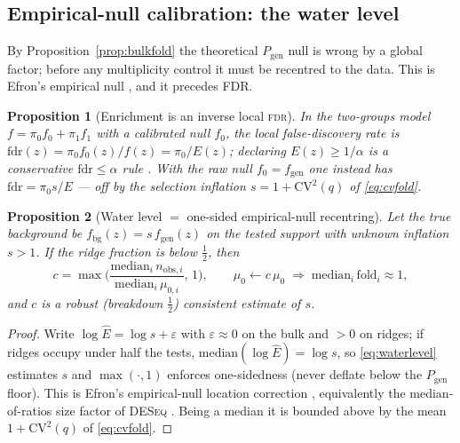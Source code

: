 \documentclass[11pt]{article}
\theoremstyle{oldplain}
\newtheorem{proposition}{Proposition}
\theoremstyle{oldrem}
\newcommand{\Pgen}{P_{\mathrm{gen}}}
\begin{document}
\subsection{Empirical-null calibration: the water level}\label{sec:dens-null}

By Proposition~\ref{prop:bulkfold} the theoretical $\Pgen$ null is wrong by a global factor; before any
multiplicity control it must be recentred to the data. This is Efron's empirical null
\cite{Efron2004}, and it precedes {\scshape FDR}.

\begin{proposition}[Enrichment is an inverse local {\scshape fdr}]\label{prop:localfdr}
In the two-groups model $f=\pi_0 f_0+\pi_1 f_1$ with a \emph{calibrated} null $f_0$, the local false-discovery
rate is $\mathrm{fdr}(z)=\pi_0 f_0(z)/f(z)=\pi_0/E(z)$; declaring $E(z)\ge1/\alpha$ is a conservative
$\mathrm{fdr}\le\alpha$ rule \cite{Efron2004}. With the raw null $f_0=f_{\mathrm{gen}}$ one instead has
$\mathrm{fdr}=\pi_0 s/E$ --- off by the selection inflation $s=1+\mathrm{CV}^2(q)$ of \eqref{eq:cvfold}.
\end{proposition}

\begin{proposition}[Water level $=$ one-sided empirical-null recentring]\label{prop:empnull}
Let the true background be $f_{\mathrm{bg}}(z)=s\,f_{\mathrm{gen}}(z)$ on the tested support with unknown
inflation $s>1$. If the ridge fraction is below $\tfrac12$, then
\begin{equation}\label{eq:waterlevel}
  c=\max\!\Big(\frac{\mathrm{median}_i\,n_{\mathrm{obs},i}}{\mathrm{median}_i\,\mu_{0,i}},\,1\Big),
  \qquad \mu_0\leftarrow c\,\mu_0
  \;\Longrightarrow\; \mathrm{median}_i\,\mathrm{fold}_i\approx1,
\end{equation}
and $c$ is a robust (breakdown $\tfrac12$) consistent estimate of $s$.
\end{proposition}
\begin{proof}
Write $\log\hat E=\log s+\varepsilon$ with $\varepsilon\approx0$ on the bulk and $>0$ on ridges; if ridges
occupy under half the tests, $\mathrm{median}(\log\hat E)=\log s$, so \eqref{eq:waterlevel} estimates $s$ and
$\max(\cdot,1)$ enforces one-sidedness (never deflate below the $\Pgen$ floor). This is Efron's empirical-null
location correction \cite{Efron2004}, equivalently the median-of-ratios size factor of {\scshape DESeq}
\cite{AndersHuber2010}. Being a median it is bounded above by the mean $1+\mathrm{CV}^2(q)$ of
\eqref{eq:cvfold}.
\end{proof}
\end{document}
